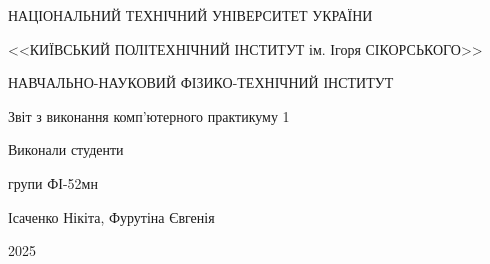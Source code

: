 \documentclass[a4paper,12pt]{article}
\begin{document}
\begin{titlepage}

\begin{center}
{\large НАЦІОНАЛЬНИЙ ТЕХНІЧНИЙ УНІВЕРСИТЕТ УКРАЇНИ} \par
{\large <<КИЇВСЬКИЙ ПОЛІТЕХНІЧНИЙ ІНСТИТУТ ім. Ігоря СІКОРСЬКОГО>>}\par
{\large НАВЧАЛЬНО-НАУКОВИЙ ФІЗИКО-ТЕХНІЧНИЙ ІНСТИТУТ}\par

\vspace{60mm}
{\huge Звіт з виконання комп'ютерного практикуму 1 \par}
\end{center}

\vspace{60mm}
\begin{flushright}
{\Large Виконали студенти}

{\Large групи ФІ-52мн}

{\Large Ісаченко Нікіта, Фурутіна Євгенія}

\vspace{30mm}
\end{flushright}
\vspace{30mm}

\begin{center}
{\Large 2025}
\end{center}

\end{titlepage}
\end{document}
